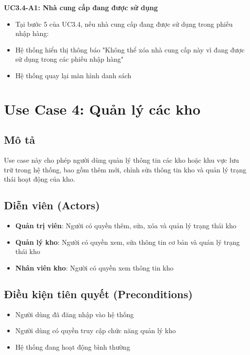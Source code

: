 \documentclass[a4paper,12pt]{article}
\begin{document}
\textbf{UC3.4-A1: Nhà cung cấp đang được sử dụng}
\begin{itemize}
    \item Tại bước 5 của UC3.4, nếu nhà cung cấp đang được sử dụng trong phiếu nhập hàng:
    \item Hệ thống hiển thị thông báo "Không thể xóa nhà cung cấp này vì đang được sử dụng trong các phiếu nhập hàng"
    \item Hệ thống quay lại màn hình danh sách
\end{itemize}

\newpage

\section{Use Case 4: Quản lý các kho}

\subsection{Mô tả}
Use case này cho phép người dùng quản lý thông tin các kho hoặc khu vực lưu trữ trong hệ thống, bao gồm thêm mới, chỉnh sửa thông tin kho và quản lý trạng thái hoạt động của kho.

\subsection{Diễn viên (Actors)}
\begin{itemize}
    \item \textbf{Quản trị viên}: Người có quyền thêm, sửa, xóa và quản lý trạng thái kho
    \item \textbf{Quản lý kho}: Người có quyền xem, sửa thông tin cơ bản và quản lý trạng thái kho
    \item \textbf{Nhân viên kho}: Người có quyền xem thông tin kho
\end{itemize}

\subsection{Điều kiện tiên quyết (Preconditions)}
\begin{itemize}
    \item Người dùng đã đăng nhập vào hệ thống
    \item Người dùng có quyền truy cập chức năng quản lý kho
    \item Hệ thống đang hoạt động bình thường
\end{itemize}
\end{document}
